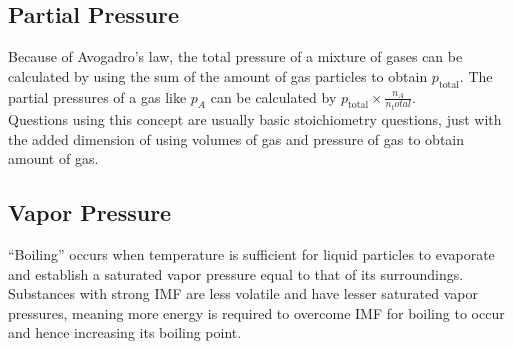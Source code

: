 \documentclass[../main]{subfiles}
\begin{document}
	\subsection{Partial Pressure}



	Because of Avogadro's law, the total pressure of a mixture of gases can be calculated by using the sum of the amount of gas particles to obtain \(p_\text{total}\). The partial pressures of a gas like \(p_A\) can be calculated by \(p_\text{total} \times \frac{n_A}{n_total}\). \\

	Questions using this concept are usually basic stoichiometry questions, just with the added dimension of using volumes of gas and pressure of gas to obtain amount of gas.

	\subsection{Vapor Pressure}




	``Boiling'' occurs when temperature is sufficient for liquid particles to evaporate and establish a saturated vapor pressure equal to that of its surroundings. Substances with strong IMF are less volatile and have lesser saturated vapor pressures, meaning more energy is required to overcome IMF for boiling to occur and hence increasing its boiling point.
\end{document}
